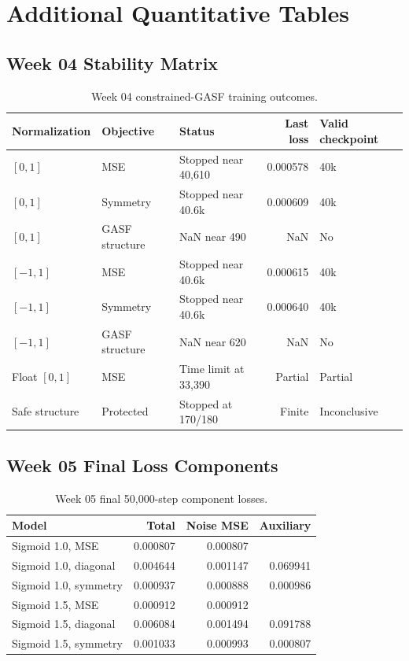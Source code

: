 \documentclass[12pt,a4paper,oneside]{report}
\newcommand{\NA}{\textemdash}
\begin{document}
\chapter{Additional Quantitative Tables}
\label{app:tables}

\section{Week 04 Stability Matrix}

\begin{table}[htbp]
\centering
\caption{Week 04 constrained-GASF training outcomes.}
\label{tab:week04-status}
\small
\begin{tabular}{L{0.19\textwidth}L{0.20\textwidth}L{0.25\textwidth}rL{0.20\textwidth}}
\toprule
Normalization & Objective & Status & Last loss & Valid checkpoint \\
\midrule
$[0,1]$ & MSE & Stopped near 40,610 & 0.000578 & 40k \\
$[0,1]$ & Symmetry & Stopped near 40.6k & 0.000609 & 40k \\
$[0,1]$ & GASF structure & NaN near 490 & NaN & No \\
$[-1,1]$ & MSE & Stopped near 40.6k & 0.000615 & 40k \\
$[-1,1]$ & Symmetry & Stopped near 40.6k & 0.000640 & 40k \\
$[-1,1]$ & GASF structure & NaN near 620 & NaN & No \\
Float $[0,1]$ & MSE & Time limit at 33,390 & Partial & Partial \\
Safe structure & Protected & Stopped at 170/180 & Finite & Inconclusive \\
\bottomrule
\end{tabular}
\end{table}

\section{Week 05 Final Loss Components}

\begin{table}[htbp]
\centering
\caption{Week 05 final 50,000-step component losses.}
\label{tab:week05-losses}
\begin{tabular}{L{0.35\textwidth}rrr}
\toprule
Model & Total & Noise MSE & Auxiliary \\
\midrule
Sigmoid 1.0, MSE & 0.000807 & 0.000807 & \NA \\
Sigmoid 1.0, diagonal & 0.004644 & 0.001147 & 0.069941 \\
Sigmoid 1.0, symmetry & 0.000937 & 0.000888 & 0.000986 \\
Sigmoid 1.5, MSE & 0.000912 & 0.000912 & \NA \\
Sigmoid 1.5, diagonal & 0.006084 & 0.001494 & 0.091788 \\
Sigmoid 1.5, symmetry & 0.001033 & 0.000993 & 0.000807 \\
\bottomrule
\end{tabular}
\end{table}
\end{document}

